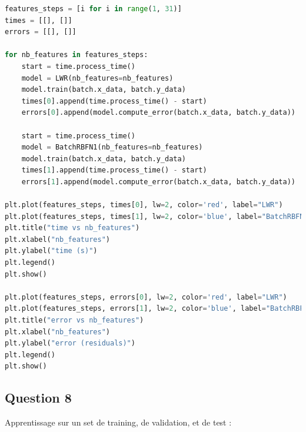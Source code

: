 \documentclass[french,12pt]{article}
\begin{document}
\begin{lstlisting}[language=Python]
features_steps = [i for i in range(1, 31)]
times = [[], []]
errors = [[], []]

for nb_features in features_steps:
    start = time.process_time()
    model = LWR(nb_features=nb_features)
    model.train(batch.x_data, batch.y_data)
    times[0].append(time.process_time() - start)
    errors[0].append(model.compute_error(batch.x_data, batch.y_data))

    start = time.process_time()
    model = BatchRBFN1(nb_features=nb_features)
    model.train(batch.x_data, batch.y_data)
    times[1].append(time.process_time() - start)
    errors[1].append(model.compute_error(batch.x_data, batch.y_data))

plt.plot(features_steps, times[0], lw=2, color='red', label="LWR")
plt.plot(features_steps, times[1], lw=2, color='blue', label="BatchRBFN")
plt.title("time vs nb_features")
plt.xlabel("nb_features")
plt.ylabel("time (s)")
plt.legend()
plt.show()

plt.plot(features_steps, errors[0], lw=2, color='red', label="LWR")
plt.plot(features_steps, errors[1], lw=2, color='blue', label="BatchRBFN")
plt.title("error vs nb_features")
plt.xlabel("nb_features")
plt.ylabel("error (residuals)")
plt.legend()
plt.show()

\end{lstlisting}

\subsection*{Question 8}

\noindent Apprentissage sur un set de training, de validation, et de test :
\end{document}
